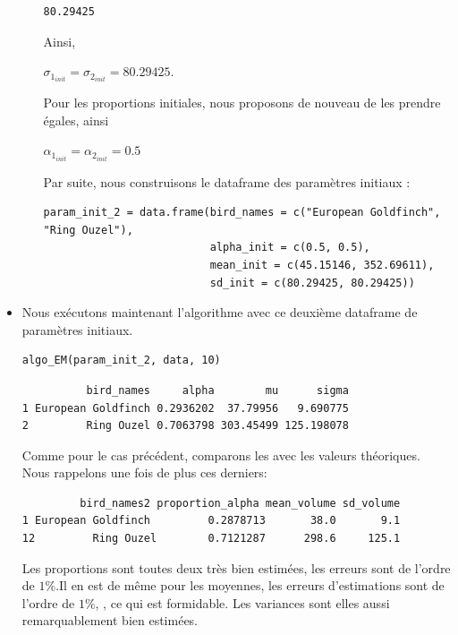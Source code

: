 \documentclass[frenchb]{report}
\newcommand{\1}{\mathbbm{1}}
\theoremstyle{definition}\newtheorem{defn}{Définition}
\theoremstyle{definition}\newtheorem{exm}{Exemple}
\theoremstyle{definition}\newtheorem{nota}{Notation}
\theoremstyle{definition}\newtheorem{rem}{Remarque}
\begin{document}
\begin{itemize}[label=\adfflowerleft]
\begin{itemize}[label=\adfflowerleft]
\begin{verbatim}
80.29425
\end{verbatim}
Ainsi, 
\begin{center}
$\sigma_{1_{init}} = \sigma_{2_{init}} = 80.29425$. \newline
\end{center}
Pour les proportions initiales, nous proposons de nouveau de les prendre égales, ainsi 
\begin{center}
$\alpha_{1_{init}} = \alpha_{2_{init}} = 0.5$
\end{center}
Par suite, nous construisons le dataframe des paramètres initiaux : 
\begin{lstlisting}
param_init_2 = data.frame(bird_names = c("European Goldfinch", "Ring Ouzel"),
                          alpha_init = c(0.5, 0.5),
                          mean_init = c(45.15146, 352.69611),
                          sd_init = c(80.29425, 80.29425))
\end{lstlisting}
\end{itemize}

\item Nous exécutons maintenant l'algorithme avec ce deuxième dataframe de paramètres initiaux.
\begin{lstlisting}
algo_EM(param_init_2, data, 10)
\end{lstlisting}

\begin{verbatim}
          bird_names     alpha        mu      sigma
1 European Goldfinch 0.2936202  37.79956   9.690775
2         Ring Ouzel 0.7063798 303.45499 125.198078
\end{verbatim}

Comme pour le cas précédent, comparons les avec les valeurs théoriques. Nous rappelons une fois de plus ces derniers:
\begin{verbatim}
         bird_names2 proportion_alpha mean_volume sd_volume
1 European Goldfinch         0.2878713       38.0       9.1
12         Ring Ouzel        0.7121287      298.6     125.1
\end{verbatim}

Les proportions sont toutes deux très bien estimées, les erreurs sont de l'ordre de $1\%$.Il en est de même pour les moyennes, les erreurs d'estimations sont de l'ordre de $1\%$, , ce qui est formidable. Les variances sont elles aussi remarquablement bien estimées.

\end{itemize}
\end{document}
